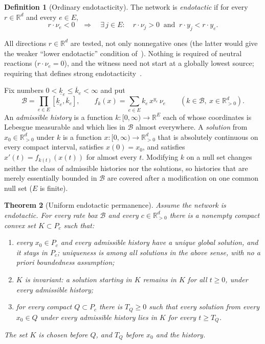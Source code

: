 \documentclass[11pt]{article}
\newtheorem{theorem}{Theorem}[section]
\theoremstyle{definition}
\newtheorem{definition}[theorem]{Definition}
\theoremstyle{remark}
\newcommand{\R}{\mathbb R}
\newcommand{\U}{\R_{>0}^{d}}
\newcommand{\B}{\mathcal B}
\begin{document}
\begin{definition}[Ordinary endotacticity]\label{def:endo}
The network is \emph{endotactic} if for every $r\in\R^d$ and every $e\in E$,
\begin{equation}\label{eq:endo}
 r\cdot\nu_e<0\quad\Longrightarrow\quad
 \exists\,j\in E:\quad r\cdot\nu_j>0\ \text{ and }\ r\cdot y_j<r\cdot y_e .
\end{equation}
\end{definition}
All directions $r\in\R^d$ are tested, not only nonnegative ones (the latter would
give the weaker ``lower endotactic'' condition of~\cite{Pantea2012}). Nothing is
required of neutral reactions ($r\cdot\nu_e=0$), and the witness need not start at
a globally lowest source; requiring that defines strong
endotacticity~\cite{GopalkrishnanMillerShiu2014,JohnstonPanteaDonnell2016}.

Fix numbers $0<\underline k_e\le\overline k_e<\infty$ and put
\[
 \B=\prod_{e\in E}[\underline k_e,\overline k_e],\qquad
 f_k(x)=\sum_{e\in E}k_e\,x^{y_e}\,\nu_e\qquad(k\in\B,\ x\in\U).
\]
An \emph{admissible history} is a function $k:[0,\infty)\to\R^E$ each of whose
coordinates is Lebesgue measurable and which lies in $\B$ almost everywhere. A \emph{solution} from $x_0\in\U$ under $k$ is a
function $x:[0,\infty)\to\U$ that is absolutely continuous on every compact
interval, satisfies $x(0)=x_0$, and satisfies $x'(t)=f_{k(t)}(x(t))$ for almost
every $t$. Modifying $k$ on a null set changes neither the class of admissible
histories nor the solutions, so histories that are merely essentially bounded in
$\B$ are covered after a modification on one common null set ($E$ is finite).

\begin{theorem}[Uniform endotactic permanence]\label{thm:main}
Assume the network is endotactic. For every rate box $\B$ and every $c\in\U$ there
is a nonempty compact convex set $K\subset P_c$ such that:
\begin{enumerate}
\item every $x_0\in P_c$ and every admissible history have a unique global
 solution, and it stays in $P_c$; uniqueness is among all solutions in the above
 sense, with no a priori boundedness assumption;
\item $K$ is invariant: a solution starting in $K$ remains in $K$ for all $t\ge0$,
 under every admissible history;
\item for every compact $Q\subset P_c$ there is $T_Q\ge0$ such that every solution
 from every $x_0\in Q$ under every admissible history lies in $K$ for every
 $t\ge T_Q$.
\end{enumerate}
The set $K$ is chosen before $Q$, and $T_Q$ before $x_0$ and the history.
\end{theorem}
\end{document}

